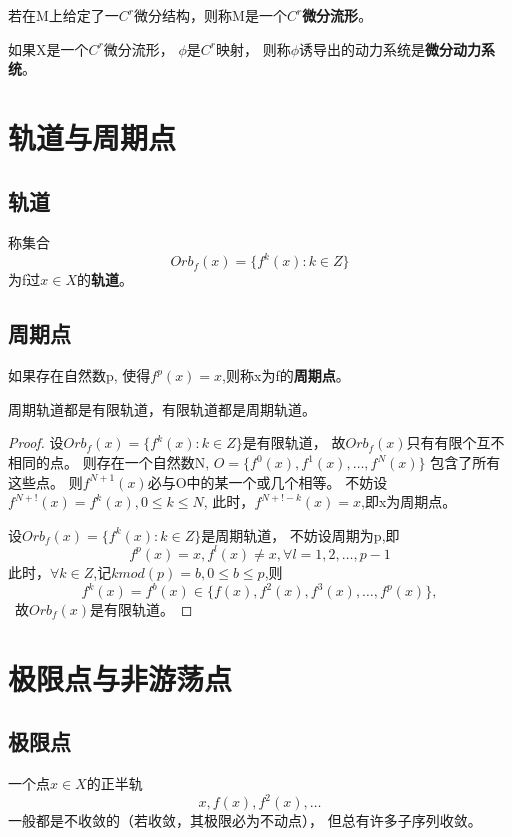 \begin{defination}[离散动力系统]
\begin{defination}
\end{defination}

\begin{defination}
若在M上给定了一\(C^r\)微分结构，则称M是一个\(C^r\)\textbf{微分流形}。
\end{defination}

\begin{defination}
如果X是一个\(C^r\)微分流形，
\(\phi\)是\(C^r\)映射，
则称\(\phi\)诱导出的动力系统是\textbf{微分动力系统}。
\end{defination}


\section{轨道与周期点}

\subsection{轨道}
称集合
\[Orb_f(x)=\{f^k(x):k\in Z\}\]
为f过\(x\in X\)的\textbf{轨道}。

\subsection{周期点}
如果存在自然数p,
使得\(f^p(x)=x\),则称x为f的\textbf{周期点}。

\begin{thm}
周期轨道都是有限轨道，有限轨道都是周期轨道。
\end{thm}

\begin{proof}
设\(Orb_f(x)=\{f^k(x):k\in Z\}\)是有限轨道，
故\(Orb_f(x)\)只有有限个互不相同的点。
则存在一个自然数N,
\(O=\{f^0(x),f^1(x),\dots,f^N(x)\}\) 包含了所有这些点。
则\(f^{N+1}(x)\)必与O中的某一个或几个相等。
不妨设\(f^{N+!}(x)=f^k(x),0 \leq k \leq N\),
此时，\(f^{N+!-k}(x)=x\),即x为周期点。

设\(Orb_f(x)=\{f^k(x):k\in Z\}\)是周期轨道，
不妨设周期为p,即
\[f^p(x)=x,f^l(x)\neq x ,\forall l=1,2,\dots,p-1\]
此时，\(\forall k \in Z\),记\( k mod(p)=b,0 \leq b \leq p\),则
\[f^k(x)=f^b(x)\in \{f(x),f^2(x),f^3(x),\dots,f^p(x)\},\]\
故\(Orb_f(x)\)是有限轨道。

\end{proof}


\section{极限点与非游荡点}
\subsection{极限点}
一个点\(x \in X\)的正半轨
\[x,f(x),f^2(x),\dots\]
一般都是不收敛的（若收敛，其极限必为不动点），
但总有许多子序列收敛。


\end{defination}
